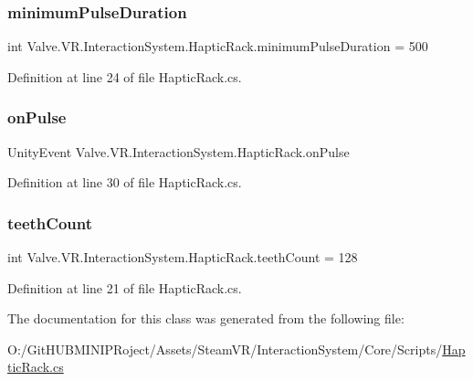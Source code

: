 \subsubsection{\texorpdfstring{minimumPulseDuration}{minimumPulseDuration}}
{\footnotesize\ttfamily int Valve.\+V\+R.\+Interaction\+System.\+Haptic\+Rack.\+minimum\+Pulse\+Duration = 500}



Definition at line 24 of file Haptic\+Rack.\+cs.

\mbox{\label{class_valve_1_1_v_r_1_1_interaction_system_1_1_haptic_rack_a19cca547466e55f45d5e5faf2e22cd13}} 
\subsubsection{\texorpdfstring{onPulse}{onPulse}}
{\footnotesize\ttfamily Unity\+Event Valve.\+V\+R.\+Interaction\+System.\+Haptic\+Rack.\+on\+Pulse}



Definition at line 30 of file Haptic\+Rack.\+cs.

\mbox{\label{class_valve_1_1_v_r_1_1_interaction_system_1_1_haptic_rack_af0af6b8328a17e2f2056a19fa4944948}} 
\subsubsection{\texorpdfstring{teethCount}{teethCount}}
{\footnotesize\ttfamily int Valve.\+V\+R.\+Interaction\+System.\+Haptic\+Rack.\+teeth\+Count = 128}



Definition at line 21 of file Haptic\+Rack.\+cs.



The documentation for this class was generated from the following file\+:\begin{DoxyCompactItemize}
\item 
O\+:/\+Git\+H\+U\+B\+M\+I\+N\+I\+P\+Roject/\+Assets/\+Steam\+V\+R/\+Interaction\+System/\+Core/\+Scripts/\mbox{\hyperlink{_haptic_rack_8cs}{Haptic\+Rack.\+cs}}\end{DoxyCompactItemize}
